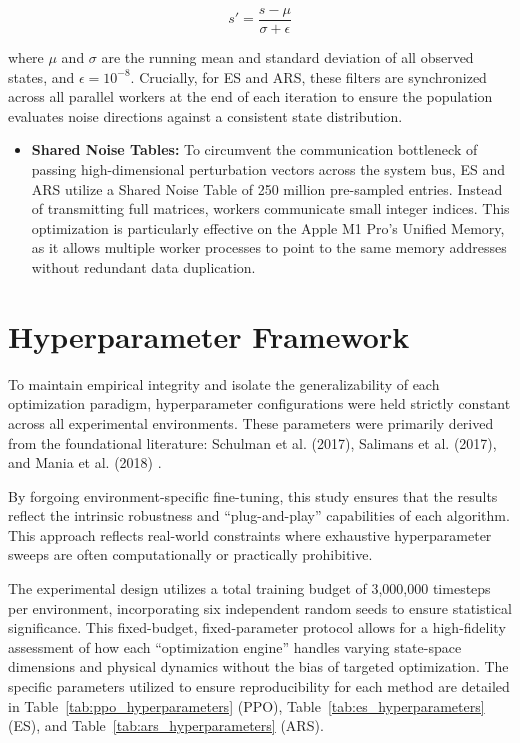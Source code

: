 \begin{equation}
s' = \frac{s - \mu}{\sigma + \epsilon}
\end{equation}

where $\mu$ and $\sigma$ are the running mean and standard deviation of all observed states, and $\epsilon = 10^{-8}$. Crucially, for ES and ARS, these filters are synchronized across all parallel workers at the end of each iteration to ensure the population evaluates noise directions against a consistent state distribution.

\begin{itemize}
    \item \textbf{Shared Noise Tables:} To circumvent the communication bottleneck of passing high-dimensional perturbation vectors across the system bus, ES and ARS utilize a Shared Noise Table of 250 million pre-sampled entries. Instead of transmitting full matrices, workers communicate small integer indices. This optimization is particularly effective on the Apple M1 Pro’s Unified Memory, as it allows multiple worker processes to point to the same memory addresses without redundant data duplication.
\end{itemize}

\section{Hyperparameter Framework}

To maintain empirical integrity and isolate the generalizability of each optimization paradigm, hyperparameter configurations were held strictly constant across all experimental environments. These parameters were primarily derived from the foundational literature: Schulman et al. (2017), Salimans et al. (2017), and Mania et al. (2018) \citep{schulman2017ppo, salimans2017es, mania2018randomsearch}.

By forgoing environment-specific fine-tuning, this study ensures that the results reflect the intrinsic robustness and ``plug-and-play'' capabilities of each algorithm. This approach reflects real-world constraints where exhaustive hyperparameter sweeps are often computationally or practically prohibitive.

The experimental design utilizes a total training budget of 3,000,000 timesteps per environment, incorporating six independent random seeds to ensure statistical significance. This fixed-budget, fixed-parameter protocol allows for a high-fidelity assessment of how each ``optimization engine'' handles varying state-space dimensions and physical dynamics without the bias of targeted optimization. The specific parameters utilized to ensure reproducibility for each method are detailed in Table~\ref{tab:ppo_hyperparameters} (PPO), Table~\ref{tab:es_hyperparameters} (ES), and Table~\ref{tab:ars_hyperparameters} (ARS).

